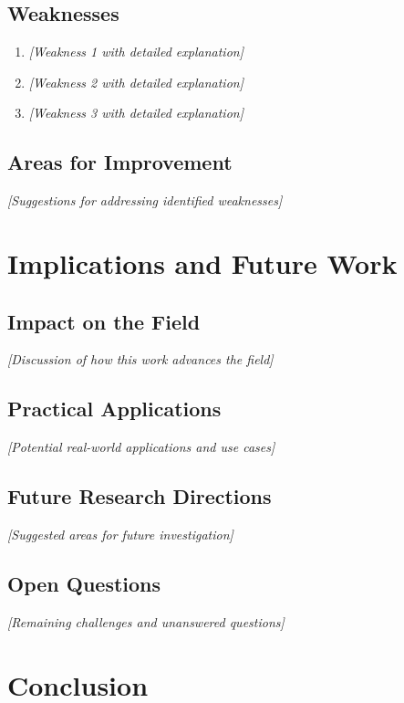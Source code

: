 \documentclass[12pt,a4paper]{article}
\begin{document}
\subsection{Weaknesses}
\begin{enumerate}
    \item \textit{[Weakness 1 with detailed explanation]}
    \item \textit{[Weakness 2 with detailed explanation]}
    \item \textit{[Weakness 3 with detailed explanation]}
\end{enumerate}

\subsection{Areas for Improvement}
\textit{[Suggestions for addressing identified weaknesses]}

\section{Implications and Future Work}

\subsection{Impact on the Field}
\textit{[Discussion of how this work advances the field]}

\subsection{Practical Applications}
\textit{[Potential real-world applications and use cases]}

\subsection{Future Research Directions}
\textit{[Suggested areas for future investigation]}

\subsection{Open Questions}
\textit{[Remaining challenges and unanswered questions]}

\section{Conclusion}
\end{document}
